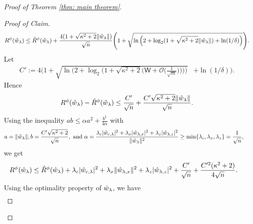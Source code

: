 \begin{proof}[Proof of Theorem \ref{thm: main theorem}]
\begin{proof}[Proof of Claim]
        \begin{equation*}
            \begin{aligned}
                R^\phi(\hat{w}_\lambda) \leq
                \hat{R}^\phi(\hat{w}_\lambda) +
                \frac{4(1+\sqrt{\kappa^2+2}\|\hat{w}_\lambda\|)}{\sqrt{n}}\Bigg(1+\sqrt{\ln\Big(2+\log_2(1+\sqrt{\kappa^2+2}\|\hat{w}_\lambda\|)+\ln(1/\delta)\Big)}\Bigg).
            \end{aligned}
        \end{equation*}
        Let
        \begin{equation*}
            \begin{aligned}
                C' := 4\Bigg(1 +
                \sqrt{\ln\Bigg(2 +
                \log_2\Big(1 +
                \sqrt{\kappa^2+2}\Big(\mathsf{W} +
                \mathcal{O}\Big(\frac{1}{\sqrt{m}}\Big)\Big)\Big)\Bigg)}
                &+ \ln(1/\delta)\Bigg).
            \end{aligned}
        \end{equation*}
Hence
        \begin{equation*}
            R^\phi(\hat{w}_\lambda) - \hat{R}^\phi(\hat{w}_\lambda)
            \leq\frac{C'}{\sqrt{n}} +
                \frac{C'\sqrt{\kappa^2+2}\|\hat{w}_\lambda\|}{\sqrt{n}}.
        \end{equation*}
        Using the inequality $ab \leq \alpha a^2 + \frac{b^2}{4\alpha}$ with 
        \begin{equation*}
        \begin{aligned}
            &a = \|\hat{w}_\lambda\|, b = \frac{C'\sqrt{\kappa^2+2}}{\sqrt{n}}, \text{ and } \alpha = \frac{\lambda_c|\hat{w}_{c,\lambda}|^2+\lambda_x|\hat{w}_{\lambda,x}|^2+\lambda_z|\hat{w}_{\lambda,z}|^2}{\|\hat{w}_\lambda\|^2} \geq \min\{\lambda_c,\lambda_x,\lambda_z\} = \frac{1}{\sqrt{n}},
            \end{aligned}
        \end{equation*}
   we get
        \begin{equation}\label{eqn: replacing w hat with w lambda star}
            \begin{aligned}
                 R^\phi(\hat{w}_\lambda) &\leq
                 \hat{R}^\phi(\hat{w}_\lambda) +
                 \lambda_c|\hat{w}_{c,\lambda}|^2 +
                 \lambda_x\|\hat{w}_{\lambda,x}\|^2 +
                 \lambda_z|\hat{w}_{\lambda,z}|^2 +  \frac{C'}{\sqrt{n}} +
                 \frac{C'^2(\kappa^2+2)}{4\sqrt{n}}.
            \end{aligned}
        \end{equation}
        Using the optimality property of $\hat{w}_\lambda$, we have
        \begin{equation*}
            \begin{aligned}

\end{aligned}
\end{equation*}
\end{proof}
\end{proof}
